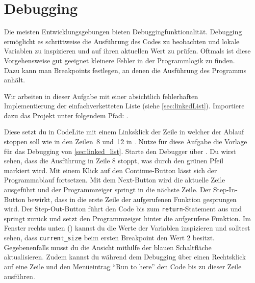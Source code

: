 \section{\ExercisePrefixMemory Debugging \optional}\label{sec:debugging}
\optionaltextbox

Die meisten Entwicklungsgebungen bieten Debuggingfunktionalität.
Debugging ermöglicht es schrittweise die Ausführung des Codes zu beobachten und lokale Variablen zu inspizieren und auf ihren aktuellen Wert zu prüfen. Oftmals ist diese Vorgehensweise gut geeignet kleinere Fehler in der Programmlogik zu finden.
Dazu kann man Breakpoints festlegen, an denen die Ausführung des Programms anhält.

Wir arbeiten in dieser Aufgabe mit einer absichtlich fehlerhaften Implementierung der einfachverketteten Liste (siehe \ref{sec:linkedList}).
Importiere dazu das Projekt unter folgendem Pfad: .

Diese setzt du in CodeLite mit einem Linksklick der Zeile in welcher der Ablauf stoppen soll wie in den Zeilen~8 und~12 in . 
Nutze für diese Aufgabe die Vorlage für das Debugging von \ref{sec:linked_list}. Starte den Debugger über .
Du wirst sehen, dass die Ausführung in Zeile 8 stoppt, was durch den grünen Pfeil markiert wird. 
Mit einem Klick auf den Continue-Button  lässt sich der Programmablauf fortsetzen.
Mit dem Next-Button   wird die aktuelle Zeile ausgeführt und der Programmzeiger springt in die nächste Zeile.
Der Step-In-Button  bewirkt, dass in die erste Zeile der aufgerufenen Funktion gesprungen wird.
Der Step-Out-Button   führt den Code bis zum \lstinline|return|-Statement aus und springt zurück und setzt den Programmzeiger hinter die aufgerufene Funktion.
Im Fenster rechts unten () kannst du die Werte der Variablen inspizieren und solltest sehen, dass \lstinline|current_size| beim ersten Breakpoint den Wert 2 besitzt.
Gegebenenfalls musst du die Ansicht mithilfe der blauen Schaltfläche  aktualisieren.
Zudem kannst du während dem Debugging über einen Rechtsklick auf eine Zeile und den Menüeintrag \enquote{Run to here} den Code bis zu dieser Zeile ausführen.
 
 

